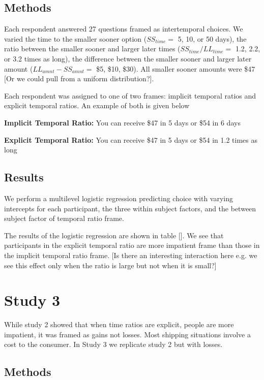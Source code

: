 \documentclass[]{article}
\begin{document}
\subsection{Methods}

Each respondent answered 27 questions framed as intertemporal choices.
We varied the time to the smaller sooner option ($SS_{time} =$ 5, 10, or 50 days), 
the ratio between the smaller sooner and larger later times ($SS_{time} / LL_{time}  = $ 1.2, 2.2, or 3.2 times as long), 
 the difference between the smaller sooner and larger later amount ($LL_{amnt} - SS_{amnt} =$ \$5, \$10, \$30). All smaller sooner amounts were \$47 [Or we could pull from a uniform distribution?].

Each respondent was assigned to one of two frames: implicit temporal ratios and explicit temporal ratios. An example of both is given below

\textbf{Implicit Temporal Ratio: } You can receive \$47 in 5 days or \$54 in 6 days

\textbf{Explicit Temporal Ratio: } You can receive \$47 in 5 days or \$54 in 1.2 times as long

\subsection{Results}

We perform a multilevel logistic regression predicting choice with varying intercepts for each participant, the three within subject factors, and the between subject factor of temporal ratio frame. 

The results of the logistic regression are shown in table []. We see that participants in the explicit temporal ratio are more impatient frame than those in the implicit temporal ratio frame. [Is there an interesting interaction here e.g. we see this effect only when the ratio is large but not when it is small?]


\section{Study 3}

While study 2 showed that when time ratios are explicit, people are more impatient, it was framed as gains not losses.
Most shipping situations involve a cost to the consumer. 
In Study 3 we replicate study 2 but with losses.

\subsection{Methods}
\end{document}
